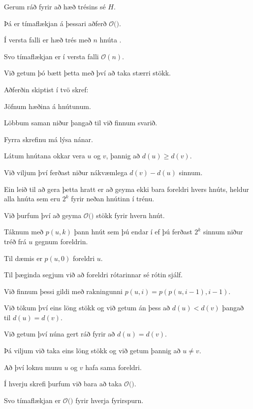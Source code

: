 {
}

{
	{
		\item<1-> Gerum ráð fyrir að hæð trésins sé $H$.
		\item<2-> Þá er tímaflækjan á þessari aðferð $\mathcal{O}($\onslide<3->{$\,H\,$}$)$.
		\item<4-> Í versta falli er hæð trés með $n$ hnúta \onslide<5->{$n - 1$}.
		\item<6-> Svo tímaflækjan er í versta falli $\mathcal{O}(n)$.
		\item<7-> Við getum þó bætt þetta með því að taka stærri stökk.
	}
}

{
	{
		\item<1-> Aðferðin skiptist í tvö skref:
		{
			\item<2-> Jöfnum hæðina á hnútunum.
			\item<3-> Löbbum saman niður þangað til við finnum svarið.
		}
		\item<4-> Fyrra skrefinu má lýsa nánar.
		\item<5-> Látum hnútana okkar vera $u$ og $v$, þannig að $d(u) \geq d(v)$.
		\item<6-> Við viljum því ferðast niður nákvæmlega $d(v) - d(u)$ sinnum.
		\item<7-> Ein leið til að gera þetta hratt er að geyma ekki bara foreldri hvers hnúts,
					heldur alla hnúta sem eru $2^k$ fyrir neðan hnútinn í trénu.
		\item<8-> Við þurfum því að geyma $\mathcal{O}($$)$ stökk fyrir hvern hnút.
		\item<10-> Táknum með $p(u, k)$ þann hnút sem þú endar í ef þú ferðast $2^k$ sinnum niður tréð frá $u$ gegnum foreldrin.
		\item<11-> Til dæmis er $p(u, 0)$ foreldri $u$.
		\item<12-> Til þæginda segjum við að foreldri rótarinnar sé rótin sjálf.
		\item<13-> Við finnum þessi gildi með rakningunni $p(u, i) = p(p(u, i - 1), i - 1)$.
	}
}

{
	{
		\item<1-> Við tökum því eins löng stökk og við getum án þess að $d(u) < d(v)$ þangað til $d(u) = d(v)$.
		\item<2-> Við getum því núna gert ráð fyrir að $d(u) = d(v)$.
		\item<3-> Þá viljum við taka eins löng stökk og við getum þannig að $u \neq v$.
		\item<4-> Að því loknu munu $u$ og $v$ hafa sama foreldri.
	}
}

{
}

{
	{
		\item<1-> Í hverju skrefi þurfum við bara að taka $\mathcal{O}($\onslide<2->{$\log n$}$)$.
		\item<3-> Svo tímaflækjan er $\mathcal{O}($$)$ fyrir hverja fyrirspurn.
	}
}

{
}


